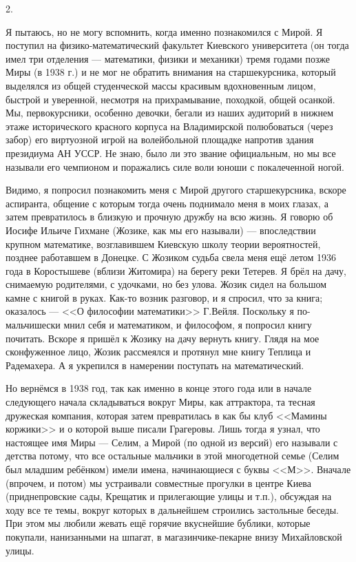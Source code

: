 2.

Я пытаюсь, но не могу вспомнить, когда именно познакомился с Мирой. Я поступил на физико-математический факультет Киевского университета (он тогда имел три отделения --- математики, физики и механики) тремя годами позже Миры (в 1938 г.) и не мог не обратить внимания на старшекурсника, который выделялся из общей студенческой массы красивым вдохновенным лицом, быстрой и уверенной, несмотря на прихрамывание, походкой, общей осанкой. Мы, первокурсники, особенно девочки, бегали из наших аудиторий в нижнем этаже исторического красного корпуса на Владимирской полюбоваться (через забор) его виртуозной игрой на волейбольной площадке напротив здания президиума АН УССР. Не знаю, было ли это звание официальным, но мы все называли его чемпионом и поражались силе воли юноши с покалеченной ногой.

Видимо, я попросил познакомить меня с Мирой другого старшекурсника, вскоре аспиранта, общение с которым тогда очень поднимало меня в моих глазах, а затем превратилось в близкую и прочную дружбу на всю жизнь. Я говорю об Иосифе Ильиче Гихмане (Жозике, как мы его называли) --- впоследствии крупном математике, возглавившем Киевскую школу теории вероятностей, позднее работавшем в Донецке. С Жозиком судьба свела меня ещё летом 1936 года в Коростышеве (вблизи Житомира) на берегу реки Тетерев. Я брёл на дачу, снимаемую родителями, с удочками, но без улова. Жозик сидел на большом камне с книгой в руках. Как-то возник разговор, и я спросил, что за книга; оказалось --- <<О философии математики>> Г.Вейля. Поскольку я по-мальчишески мнил себя и математиком, и философом, я попросил книгу почитать. Вскоре я пришёл к Жозику на дачу вернуть книгу. Глядя на мое сконфуженное лицо, Жозик рассмеялся и протянул мне книгу Теплица и Радемахера. А я укрепился в намерении поступать на математический.

Но вернёмся в 1938 год, так как именно в конце этого года или в начале следующего начала складываться вокруг Миры, как аттрактора, та тесная дружеская компания, которая затем превратилась в как бы клуб <<Мамины коржики>> и о которой выше писали Грагеровы. Лишь тогда я узнал, что настоящее имя Миры --- Селим, а Мирой (по одной из версий) его называли с детства потому, что все остальные мальчики в этой многодетной семье (Селим был младшим ребёнком) имели имена, начинающиеся с буквы <<М>>. Вначале (впрочем, и потом) мы устраивали совместные прогулки в центре Киева (приднепровские сады, Крещатик и прилегающие улицы и т.п.), обсуждая на ходу все те темы, вокруг которых в дальнейшем строились застольные беседы. При этом мы любили жевать ещё горячие вкуснейшие бублики, которые покупали, нанизанными на шпагат, в магазинчике-пекарне внизу Михайловской улицы.


